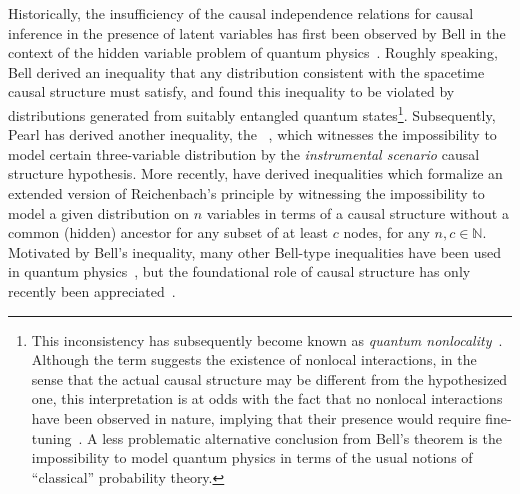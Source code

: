 Historically, the insufficiency of the causal independence relations for causal inference in the presence of latent variables has first been observed by Bell in the context of the hidden variable problem of quantum physics~\cite{bell1964einstein}. Roughly speaking, Bell derived an inequality that any distribution consistent with the spacetime causal structure must satisfy, and found this inequality to be violated by distributions generated from suitably entangled quantum states\footnote{This inconsistency has subsequently become known as \emph{quantum nonlocality}~\cite{Brunner2013Bell}. Although the term suggests the existence of nonlocal interactions, in the sense that the actual causal structure may be different from the hypothesized one, this interpretation is at odds with the fact that no nonlocal interactions have been observed in nature, implying that their presence would require fine-tuning~\cite{WoodSpekkens}. A less problematic alternative conclusion from Bell's theorem is the impossibility to model quantum physics in terms of the usual notions of ``classical'' probability theory.}. Subsequently, Pearl has derived another inequality, the ~\cite{pearl1995instrumental}, which witnesses the impossibility to model certain three-variable distribution by the \emph{instrumental scenario} causal structure hypothesis. More recently, \citet{steudel2010ancestors} have derived inequalities which formalize an extended version of Reichenbach's principle by witnessing the impossibility to model a given distribution on $n$ variables in terms of a causal structure without a common (hidden) ancestor for any subset of at least $c$ nodes, for any $n,c\in\mathbb{N}$. Motivated by Bell's inequality, many other Bell-type inequalities have been used in quantum physics~\cite{Brunner2013Bell}, but the foundational role of causal structure has only recently been appreciated~\cite{WoodSpekkens,fritz2012bell,pusey2014gdag,BeyondBellII}.


